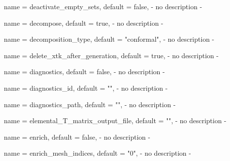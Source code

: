 \begin{parameter}{
    name    = {deactivate_empty_sets},
    default = {false},
}
- no description -
\end{parameter}

\begin{parameter}{
    name    = {decompose},
    default = {true},
}
- no description -
\end{parameter}

\begin{parameter}{
    name    = {decomposition_type},
    default = {"conformal"},
}
- no description -
\end{parameter}

\begin{parameter}{
    name    = {delete_xtk_after_generation},
    default = {true},
}
- no description -
\end{parameter}

\begin{parameter}{
    name    = {diagnostics},
    default = {false},
}
- no description -
\end{parameter}

\begin{parameter}{
    name    = {diagnostics_id},
    default = {""},
}
- no description -
\end{parameter}

\begin{parameter}{
    name    = {diagnostics_path},
    default = {""},
}
- no description -
\end{parameter}

\begin{parameter}{
    name    = {elemental_T_matrix_output_file},
    default = {""},
}
- no description -
\end{parameter}

\begin{parameter}{
    name    = {enrich},
    default = {false},
}
- no description -
\end{parameter}

\begin{parameter}{
    name    = {enrich_mesh_indices},
    default = {"0"},
}
- no description -
\end{parameter}

